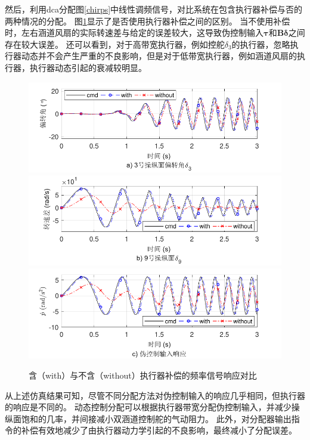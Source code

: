 然后，利用dca分配图\ref{chirps}中线性调频信号，对比系统在包含执行器补偿与否的两种情况的分配。 图\ref{compensation}显示了是否使用执行器补偿之间的区别。 当不使用补偿时，左右涵道风扇的实际转速差与给定的误差较大，这导致伪控制输入$ \bm {\tau} $和$ \bm {B \delta} $之间存在较大误差。 还可以看到，对于高带宽执行器，例如控舵$ \delta_3 $的执行器，忽略执行器动态并不会产生严重的不良影响，但是对于低带宽执行器，例如涵道风扇的执行器，执行器动态引起的衰减较明显。
\begin{figure}[htbp]
	\centering	
	\includegraphics[scale=1]{Fig/TDF_chirps_without_comp_a.pdf}
	\includegraphics[scale=1]{Fig/TDF_chirps_without_comp_b.pdf}
	\includegraphics[scale=1]{Fig/TDF_chirps_without_comp_c.pdf}
	\caption{\label{compensation}含（with）与不含（without）执行器补偿的频率信号响应对比}
\end{figure}

从上述仿真结果可知，尽管不同分配方法对伪控制输入的响应几乎相同，但执行器的响应是不同的。 动态控制分配可以根据执行器带宽分配伪控制输入，并减少操纵面饱和的几率，并间接减小双涵道控制舵的气动阻力。 此外，对分配器输出指令的补偿有效地减少了由执行器动力学引起的不良影响，最终减小了分配误差。
%
